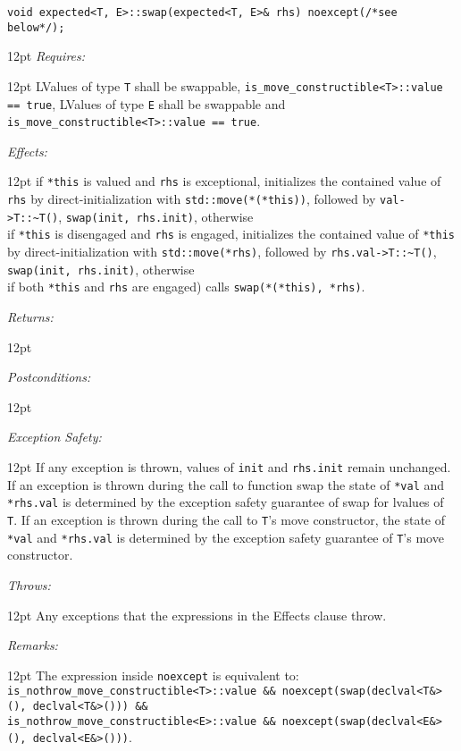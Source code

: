 \documentclass[a4paper,10pt]{article}
\newcommand{\cpp}[1]{\lstinline{#1}}
\newcommand{\wordingItem}[1]{\noindent\textit{#1:}}
\newenvironment{wordingTextItem}[1]{\wordingItem{#1}\vspace{7pt}\noindent\begin{adjustwidth}{12pt}{}}{\vspace{7pt}\end{adjustwidth}}
\newenvironment{wordingPara}{\begin{adjustwidth}{12pt}{}}{\end{adjustwidth}}
\begin{document}
\begin{lstlisting}[xleftmargin=0pt]
void expected<T, E>::swap(expected<T, E>& rhs) noexcept(/*see below*/); 
\end{lstlisting}
\begin{wordingPara}
\begin{wordingTextItem}{Requires}
LValues of type \cpp{T} shall be swappable, \cpp{is_move_constructible<T>::value == true}, LValues of type \cpp{E} shall be swappable and \cpp{is_move_constructible<T>::value == true}.
\end{wordingTextItem}
\begin{wordingTextItem}{Effects}
if \cpp{*this} is valued and \cpp{rhs} is exceptional, initializes the contained value of \cpp{rhs} by direct-initialization with \cpp{std::move(*(*this))}, followed by \cpp{val->T::~T()}, \cpp{swap(init, rhs.init)}, otherwise \\
if \cpp{*this} is disengaged and \cpp{rhs} is engaged, initializes the contained value of \cpp{*this} by direct-initialization with \cpp{std::move(*rhs)}, followed by \cpp{rhs.val->T::~T()}, \cpp{swap(init, rhs.init)}, otherwise \\
if both \cpp{*this} and \cpp{rhs} are engaged) calls \cpp{swap(*(*this), *rhs)}. 
\end{wordingTextItem}
\begin{wordingTextItem}{Returns}
\end{wordingTextItem}
\begin{wordingTextItem}{Postconditions}
\end{wordingTextItem}
\begin{wordingTextItem}{Exception Safety}
If any exception is thrown, values of \cpp{init} and \cpp{rhs.init} remain unchanged. If an exception is thrown during the call to function swap the state of \cpp{*val} and \cpp{*rhs.val} is determined by the exception safety guarantee of swap for lvalues of \cpp{T}. If an exception is thrown during the call to \cpp{T}'s move constructor, the state of \cpp{*val} and \cpp{*rhs.val} is determined by the exception safety guarantee of \cpp{T}'s move constructor.
\end{wordingTextItem}
\begin{wordingTextItem}{Throws}
Any exceptions that the expressions in the Effects clause throw.
\end{wordingTextItem}
\begin{wordingTextItem}{Remarks}
The expression inside \cpp{noexcept} is equivalent to: \\
\cpp{is_nothrow_move_constructible<T>::value && noexcept(swap(declval<T&>(), declval<T&>())) &&} \\
\cpp{is_nothrow_move_constructible<E>::value && noexcept(swap(declval<E&>(), declval<E&>()))}.
\end{wordingTextItem}
\end{wordingPara}
\end{document}
